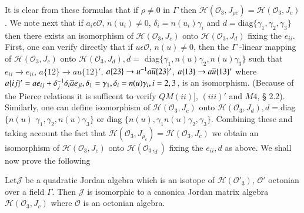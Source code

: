 It is clear from these formulas that if $\rho \neq 0$ in $\Gamma$ then
$\mathscr{H}(\mathcal{O}_3,J_{\rho
  c})=\mathscr{H}(\mathcal{O}_3,J_c)$. We note next that if
$a_i\epsilon \mathcal{O}$, $n(u_i)\neq 0$, $\delta_i=n(u_i)\gamma_i$
and $d=$diag$\{\gamma_1,\gamma_2,\gamma_3\}$ then there exists an
isomorphism of $\mathscr{H}(\mathcal{O}_3,J_c)$ onto
$\mathscr{H}(\mathcal{O}_3,J_d)$ fixing the $e_{ii}$. First, one can
verify directly that if $u\epsilon \mathcal{O}$, $n(u)\neq 0$, then
the $\Gamma$ -linear mapping of $\mathscr{H}(\mathcal{O}_3,J_c)$ onto
$\mathscr{H}(\mathcal{O}_3,J_d),d=$ diag$\{\gamma_1,
n(u)\gamma_2,n(u)\gamma_3\}$ such that $e_{ii}\to e_{ii}$, $a\{12\}\to
au\{12\}'$, $a\{23\}\to u^{-1}a \overline{u}\{23\}'$, $a\{13\}\to
a\overline{u}\{13\}'$ where
$a\{ij\}'=ae_{ij}+\delta_j^{-1}\delta_i\overline{a}e_{ji},\delta_1=\gamma_1,
\delta_i=n(u)\gamma_i, i=2,3$, is an isomorphism. (Because of the Pierce
relations it is sufficent to verify $QM(ii)]$, $(iii)'$ and $M4$, \S
  2.2). Similarly, one can define isomorphism of
  $\mathscr{H}(\mathcal{O}_3,J_c)$ onto
  $\mathscr{H}(\mathcal{O}_3,J_d),d=$diag$\{n(u)$ $\gamma_1,\gamma_2,
  n(u)\gamma_3\}$ or diag $\{n(u), \gamma_1 n(u)\gamma_2, \gamma_3\}$. Combining
  these and taking account the fact that
  $\mathscr{H}(\mathcal{O}_3,J_{\rho_c})=\mathscr{H}(\mathcal{O}_3,J_c)$
  we obtain an isomorphism of $\mathscr{H}(\mathcal{O}_3,J_c)$ onto
  $\mathscr{H}(\mathcal{O}_3,_d)$ fixing the $e_{ii},d$ as above.
We shall now prove the following

\begin{lemma*}
Let\pageoriginale $\mathscr{J}$ be a quadratic Jordan algebra which is
an isotope of $\mathscr{H}(\mathcal{O}'_3)$, $\mathcal{O}'$ octonian
over a field $\Gamma$. Then $\mathscr{J}$ is isomorphic to a canonica
Jordan matrix algebra $\mathscr{H}(\mathcal{O}_3,J_c)$ where
$\mathcal{O}$ is an octonian algebra.
\end{lemma*}

